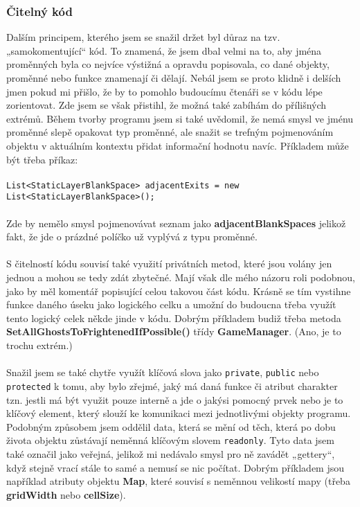 \documentclass[a4]{article}
\begin{document}
\subsubsection{Čitelný kód}
Dalším principem, kterého jsem se snažil držet byl důraz na tzv. „samokomentující“ kód. To znamená, že jsem dbal velmi na to, aby jména proměnných byla co nejvíce výstižná a opravdu popisovala, co dané objekty, proměnné nebo funkce znamenají či dělají. Nebál jsem se proto klidně i delších jmen pokud mi přišlo, že by to pomohlo budoucímu čtenáři se v kódu lépe zorientovat. Zde jsem se však přistihl, že možná také zabíhám do přílišných extrémů. Během tvorby programu jsem si také uvědomil, že nemá smysl ve jménu proměnné slepě opakovat typ proměnné, ale snažit se trefným pojmenováním objektu v aktuálním kontextu přidat informační hodnotu navíc. Příkladem může být třeba příkaz: 
\\\\
\verb|List<StaticLayerBlankSpace> adjacentExits = new List<StaticLayerBlankSpace>();|
\\\\
Zde by nemělo smysl pojmenovávat seznam jako \textbf{adjacentBlankSpaces} jelikož fakt, že jde o prázdné políčko už vyplývá z typu proměnné.
\\\\
S čitelností kódu souvisí také využití privátních metod, které jsou volány jen jednou a mohou se tedy zdát zbytečné. Mají však dle mého názoru roli podobnou, jako by měl komentář popisující celou takovou část kódu. Krásně se tím vystihne funkce daného úseku jako logického celku a umožní do budoucna třeba využít tento logický celek někde jinde v kódu. Dobrým příkladem budiž třeba metoda \textbf{SetAllGhostsToFrightenedIfPossible()} třídy \textbf{GameManager}. (Ano, je to trochu extrém.)
\\\\
Snažil jsem se také chytře využít klíčová slova jako \verb|private|, \verb|public| nebo \verb|protected| k tomu, aby bylo zřejmé, jaký má daná funkce či atribut charakter tzn. jestli má být využit pouze interně a jde o jakýsi pomocný prvek nebo je to klíčový element, který slouží ke komunikaci mezi jednotlivými objekty programu. Podobným způsobem jsem oddělil data, která se mění od těch, která po dobu života objektu zůstávají neměnná klíčovým slovem \verb|readonly|. Tyto data jsem také označil jako veřejná, jelikož mi nedávalo smysl pro ně zavádět „gettery“, když stejně vrací stále to samé a nemusí se nic počítat. Dobrým příkladem jsou například atributy objektu \textbf{Map}, které souvisí s neměnnou velikostí mapy (třeba \textbf{gridWidth} nebo \textbf{cellSize}).
\end{document}
